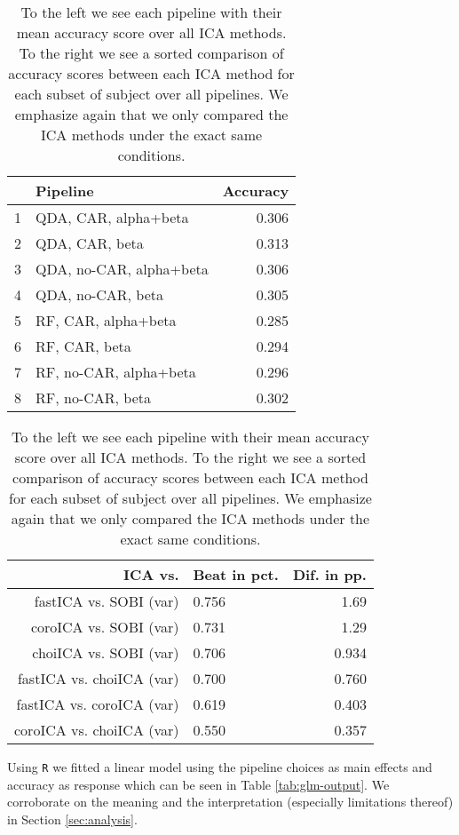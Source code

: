 	\begin{table}
	\begin{small}
	\parbox{.45\linewidth}{
	\centering
		\begin{tabular}{rlr}
  			\hline
 			& Pipeline & Accuracy \\ 
  			\hline
			1 & QDA, CAR, alpha+beta & 0.306 \\ 
  			2 & QDA, CAR, beta & 0.313 \\ 
  			3 & QDA, no-CAR, alpha+beta & 0.306 \\ 
  			4 & QDA, no-CAR, beta & 0.305 \\ 
  			5 & RF, CAR, alpha+beta & 0.285 \\ 
  			6 & RF, CAR, beta & 0.294 \\ 
  			7 & RF, no-CAR, alpha+beta & 0.296 \\ 
  			8 & RF, no-CAR, beta & 0.302 \\ 
		   \hline
		\end{tabular}}
		\parbox{.45\linewidth}{
		\centering
		\begin{tabular}{r|lr}
		\hline
			 ICA vs. & Beat in pct. & Dif. in pp. \\
			 \hline 
			 fastICA vs. SOBI (var) & 0.756 & 1.69 \\
			 coroICA vs. SOBI (var) & 0.731 &  1.29 \\
			 choiICA vs. SOBI (var) & 0.706 &  0.934 \\
			 fastICA vs. choiICA (var) & 0.700 & 0.760 \\
			 fastICA vs. coroICA (var) & 0.619 &  0.403 \\
			 coroICA vs. choiICA (var) & 0.550 & 0.357 \\
		\end{tabular}}
		\end{small}
		\caption{To the left we see each pipeline with their mean accuracy score over all ICA methods. To the right we see a sorted comparison of accuracy scores between each ICA method for each subset of subject over all pipelines. We emphasize again that we only compared the ICA methods under the exact same conditions. }
		\label{tab:accuracy-score}
	\end{table}

	Using \texttt{R} we fitted a linear model using the pipeline choices as main effects and accuracy as response which can be seen in Table \ref{tab:glm-output}. We corroborate on the meaning and the interpretation (especially limitations thereof) in Section \ref{sec:analysis}.

